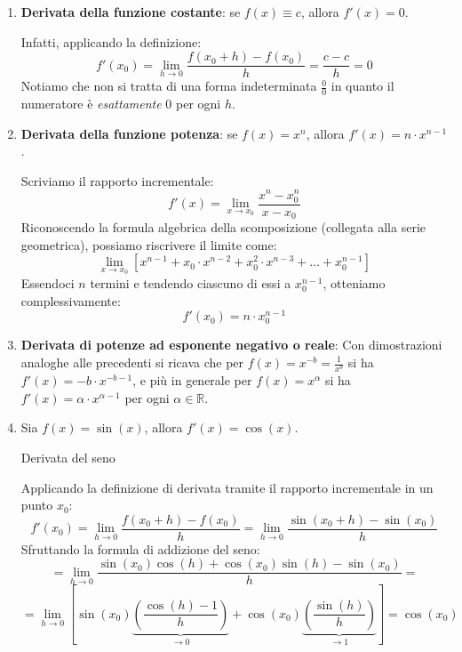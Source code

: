 \documentclass[12pt]{report}
\newcommand{\R}{\mathbb{R}}
\begin{document}
	\begin{enumerate}
		
		\item \textbf{Derivata della funzione costante}: se $f(x) \equiv c$, allora $f'(x) = 0$.
		\begin{dimostrazione}{}{}
			
			Infatti, applicando la definizione:
			\[
			f'(x_0) = \lim_{h \to 0} \frac{f(x_0 + h) - f(x_0)}{h} = \frac{c - c}{h} = 0
			\]
			Notiamo che non si tratta di una forma indeterminata $\frac{0}{0}$ in quanto il numeratore è \emph{esattamente} $0$ per ogni $h$.
			
		\end{dimostrazione}
		
		\item \textbf{Derivata della funzione potenza}: se $f(x) = x^n$, allora $f'(x) = n \cdot x^{n-1}$.
		\begin{dimostrazione}{}{}
			
			Scriviamo il rapporto incrementale:
			\[
			f'(x) = \lim_{x \to x_0} \frac{x^n - x_0^n}{x - x_0}
			\]
			Riconoscendo la formula algebrica della scomposizione (collegata alla serie geometrica), possiamo riscrivere il limite come:
			\[
			\lim_{x \to x_0} \left[ x^{n-1} + x_0 \cdot x^{n-2} + x_0^2 \cdot x^{n-3} + \dots + x_0^{n-1} \right]
			\]
			Essendoci $n$ termini e tendendo ciascuno di essi a $x_0^{n-1}$, otteniamo complessivamente:
			\[
			f'(x_0) = n \cdot x_0^{n-1}
			\]
			
		\end{dimostrazione}
		
		\item \textbf{Derivata di potenze ad esponente negativo o reale}:
		Con dimostrazioni analoghe alle precedenti si ricava che per $f(x) = x^{-b} = \frac{1}{x^b}$ si ha $f'(x) = -b \cdot x^{-b-1}$, e più in generale per $f(x) = x^\alpha$ si ha $f'(x) = \alpha \cdot x^{\alpha-1}$ per ogni $\alpha \in \R$.
		
		\item Sia $f(x) = \sin(x)$, allora $f'(x) = \cos(x)$.
		\begin{dimostrazione}{Derivata del seno}{}
			
			Applicando la definizione di derivata tramite il rapporto incrementale in un punto $x_0$:
			\[
			f'(x_0) = \lim_{h \to 0} \frac{f(x_0 + h) - f(x_0)}{h} = \lim_{h \to 0} \frac{\sin(x_0 + h) - \sin(x_0)}{h}
			\]
			Sfruttando la formula di addizione del seno:
			\[
			= \lim_{h \to 0} \frac{\sin(x_0)\cos(h) + \cos(x_0)\sin(h) - \sin(x_0)}{h} =
			\]
			\[
			= \lim_{h \to 0} \left[ \sin(x_0) \underbrace{\left(\frac{\cos(h) - 1}{h}\right)}_{\to 0} + \cos(x_0) \underbrace{\left(\frac{\sin(h)}{h}\right)}_{\to 1} \right] = \cos(x_0)
			\]
			

\end{dimostrazione}
\end{enumerate}
\end{document}
